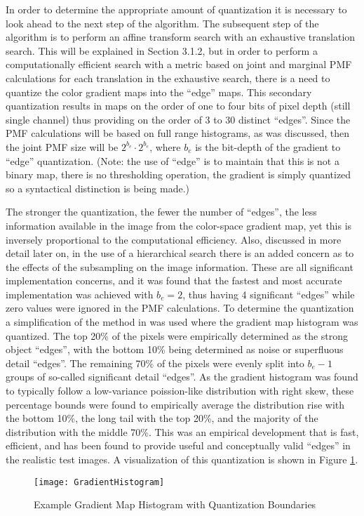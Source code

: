 In order to determine the appropriate amount of quantization it is necessary to look ahead to the next step of the algorithm. The subsequent step of the algorithm is to perform an affine transform search with an exhaustive translation search. This will be explained in Section 3.1.2, but in order to perform a computationally efficient search with a metric based on joint and marginal PMF calculations for each translation in the exhaustive search, there is a need to quantize the color gradient maps into the ``edge'' maps. This secondary quantization results in maps on the order of one to four bits of pixel depth (still single channel) thus providing on the order of 3 to 30 distinct ``edges''. Since the PMF calculations will be based on full range histograms, as was discussed, then the joint PMF size will be $2^{b_{e}}\cdot2^{b_{e}}$, where $b_{e}$ is the bit-depth of the gradient to ``edge'' quantization. (Note: the use of ``edge'' is to maintain that this is not a binary map, there is no thresholding operation, the gradient is simply quantized so a syntactical distinction is being made.)

The stronger the quantization, \ie{ }the fewer the number of ``edges'', the less information available in the image from the color-space gradient map, yet this is inversely proportional to the computational efficiency. Also, discussed in more detail later on, in the use of a hierarchical search there is an added concern as to the effects of the subsampling on the image information. These are all significant implementation concerns, and it was found that the fastest and most accurate implementation was achieved with $b_{e}=2$, thus having 4 significant ``edges'' while zero values were ignored in the PMF calculations. To determine the quantization a simplification of the method in \cite{Ugarriza2009} was used where the gradient map histogram was quantized. The top 20\% of the pixels were empirically determined as the strong object ``edges'', with the bottom 10\% being determined as noise or superfluous detail ``edges''. The remaining 70\% of the pixels were evenly split into $b_{e}-1$ groups of so-called significant detail ``edges''. As the gradient histogram was found to typically follow a low-variance poission-like distribution with right skew, these percentage bounds were found to empirically average the distribution rise with the bottom 10\%, the long tail with the top 20\%, and the majority of the distribution with the middle 70\%. This was an empirical development that is fast, efficient, and has been found to provide useful and conceptually valid ``edges'' in the realistic test images. A visualization of this quantization is shown in Figure \ref{gradienthistogram}.

\begin{figure}[h]
\centering
\texttt{[image: GradientHistogram]}
\caption{Example Gradient Map Histogram with Quantization Boundaries}
\label{gradienthistogram}
\end{figure}



